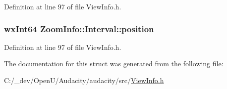 Definition at line 97 of file View\+Info.\+h.

\subsubsection[{\texorpdfstring{position}{position}}]{ wx\+Int64 Zoom\+Info\+::\+Interval\+::position}\hypertarget{struct_zoom_info_1_1_interval_ac3f8da7b5b0cad2e844ecc9b036a49d4}{}\label{struct_zoom_info_1_1_interval_ac3f8da7b5b0cad2e844ecc9b036a49d4}


Definition at line 97 of file View\+Info.\+h.



The documentation for this struct was generated from the following file\+:\begin{DoxyCompactItemize}
\item 
C\+:/\+\_\+dev/\+Open\+U/\+Audacity/audacity/src/\hyperlink{_view_info_8h}{View\+Info.\+h}\end{DoxyCompactItemize}
